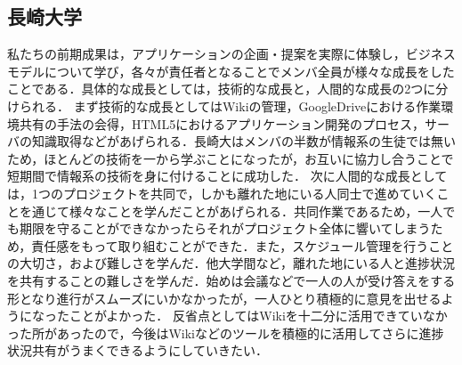 \subsection{長崎大学}
\par
私たちの前期成果は，アプリケーションの企画・提案を実際に体験し，ビジネスモデルについて学び，各々が責任者となることでメンバ全員が様々な成長をしたことである．具体的な成長としては，技術的な成長と，人間的な成長の2つに分けられる．
まず技術的な成長としてはWikiの管理，GoogleDriveにおける作業環境共有の手法の会得，HTML5におけるアプリケーション開発のプロセス，サーバの知識取得などがあげられる．長崎大はメンバの半数が情報系の生徒では無いため，ほとんどの技術を一から学ぶことになったが，お互いに協力し合うことで短期間で情報系の技術を身に付けることに成功した．
次に人間的な成長としては，1つのプロジェクトを共同で，しかも離れた地にいる人同士で進めていくことを通じて様々なことを学んだことがあげられる．共同作業であるため，一人でも期限を守ることができなかったらそれがプロジェクト全体に響いてしまうため，責任感をもって取り組むことができた．また，スケジュール管理を行うことの大切さ，および難しさを学んだ．他大学間など，離れた地にいる人と進捗状況を共有することの難しさを学んだ．始めは会議などで一人の人が受け答えをする形となり進行がスムーズにいかなかったが，一人ひとり積極的に意見を出せるようになったことがよかった．
反省点としてはWikiを十二分に活用できていなかった所があったので，今後はWikiなどのツールを積極的に活用してさらに進捗状況共有がうまくできるようにしていきたい．


